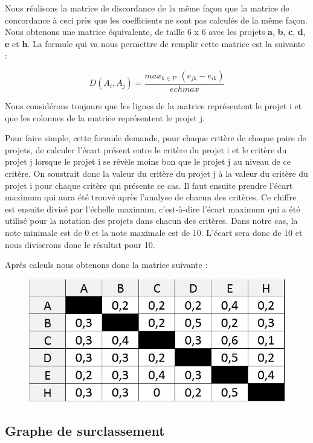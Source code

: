 \documentclass[a4paper,10pt]{article}
\begin{document}
Nous réalisons la matrice de discordance de la même façon que la matrice de concordance à ceci près que les coefficients ne sont pas calculés de la même façon. Nous obtenons une matrice équivalente, de taille 6 x 6 avec les projets \textbf{a}, \textbf{b}, \textbf{c}, \textbf{d}, \textbf{e} et \textbf{h}. La formule qui va nous permettre de remplir cette matrice est la suivante :

\[
  D(A_i, A_j) = \frac{max_{k \in P^-}(e_{jk} - e_{ik})}{echmax}
\]

Nous considérons toujours que les lignes de la matrice représentent le projet i et que les colonnes de la matrice représentent le projet j.

Pour faire simple, cette formule demande, pour chaque critère de chaque paire de projets, de calculer l'écart présent entre le critère du projet i et le critère du projet j lorsque le projet i se révèle moins bon que le projet j au niveau de ce critère. On soustrait donc la valeur du critère du projet j à la valeur du critère du projet i pour chaque critère qui présente ce cas. Il faut ensuite prendre l'écart maximum qui aura été trouvé après l'analyse de chacun des critères. Ce chiffre est ensuite divisé par l'échelle maximum, c'est-à-dire l'écart maximum qui a été utilisé pour la notation des projets dans chacun des critères. Dans notre cas, la note minimale est de 0 et la note maximale est de 10. L'écart sera donc de 10 et nous diviserons donc le résultat pour 10. 

Après calculs nous obtenons donc la matrice suivante :

\begin{figure}[h]
\begin{center}
\includegraphics[scale=0.3]{img/AD-Discordance.jpg}
\end{center}
\end{figure}

\subsection{Graphe de surclassement}
\end{document}

